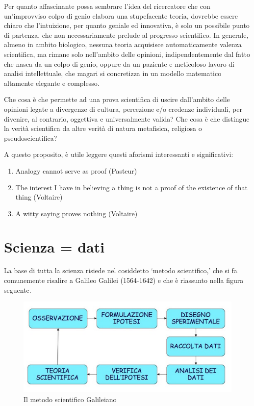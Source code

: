 \documentclass[a4paper,12pt,oneside]{book}
\providecommand{\tightlist}{%
  \setlength{\itemsep}{0pt}\setlength{\parskip}{0pt}}
\begin{document}
Per quanto affascinante possa sembrare l'idea del ricercatore che con un'improvviso colpo di genio elabora una stupefacente teoria, dovrebbe essere chiaro che l'intuizione, per quanto geniale ed innovativa, è solo un possibile punto di partenza, che non necessariamente prelude al progresso scientifico. In generale, almeno in ambito biologico, nessuna teoria acquisisce automaticamente valenza scientifica, ma rimane solo nell'ambito delle opinioni, indipendentemente dal fatto che nasca da un colpo di genio, oppure da un paziente e meticoloso lavoro di analisi intellettuale, che magari si concretizza in un modello matematico altamente elegante e complesso.

Che cosa è che permette ad una prova scientifica di uscire dall'ambito delle opinioni legate a divergenze di cultura, percezione e/o credenze individuali, per divenire, al contrario, oggettiva e universalmente valida? Che cosa è che distingue la verità scientifica da altre verità di natura metafisica, religiosa o pseudoscientifica?

A questo proposito, è utile leggere questi aforismi interessanti e significativi:

\begin{enumerate}
\def\labelenumi{\arabic{enumi}.}
\tightlist
\item
  Analogy cannot serve as proof (Pasteur)
\item
  The interest I have in believing a thing is not a proof of the existence of that thing (Voltaire)
\item
  A witty saying proves nothing (Voltaire)
\end{enumerate}

\hypertarget{scienza-dati}{%
\section{Scienza = dati}\label{scienza-dati}}

La base di tutta la scienza risiede nel cosiddetto `metodo scientifico,' che si fa comunemente risalire a Galileo Galilei (1564-1642) e che è riassunto nella figura seguente.

\begin{figure}

{\centering \includegraphics[width=0.75\linewidth]{_images/MSAMap} 

}

\caption{Il metodo scientifico Galileiano}\label{fig:figName11}
\end{figure}
\end{document}
